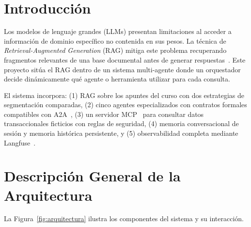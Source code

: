 \documentclass[conference]{IEEEtran}
\begin{document}
\section{Introducción}

Los modelos de lenguaje grandes (LLMs) presentan limitaciones al acceder a información de dominio específico no contenida en sus pesos. La técnica de \textit{Retrieval-Augmented Generation} (RAG) mitiga este problema recuperando fragmentos relevantes de una base documental antes de generar respuestas~\cite{lewis2020rag}. Este proyecto sitúa el RAG dentro de un sistema multi-agente donde un orquestador decide dinámicamente qué agente o herramienta utilizar para cada consulta.

El sistema incorpora: (1) RAG sobre los apuntes del curso con dos estrategias de segmentación comparadas, (2) cinco agentes especializados con contratos formales compatibles con A2A~\cite{a2a2024}, (3) un servidor MCP~\cite{mcp2024} para consultar datos transaccionales ficticios con reglas de seguridad, (4) memoria conversacional de sesión y memoria histórica persistente, y (5) observabilidad completa mediante Langfuse~\cite{langfuse2024}.

\section{Descripción General de la Arquitectura}

La Figura~\ref{fig:arquitectura} ilustra los componentes del sistema y su interacción.
\end{document}
